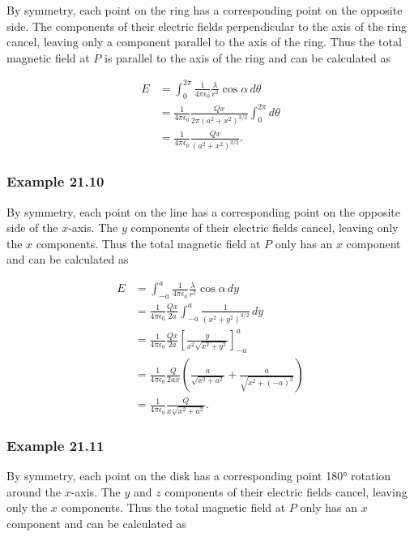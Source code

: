 \documentclass{article}
\begin{document}
By symmetry, each point on the ring has a corresponding point on the opposite side. The components of their electric fields perpendicular to the axis of the ring cancel, leaving only a component parallel to the axis of the ring. Thus the total magnetic field at $P$ is parallel to the axis of the ring and can be calculated as

\begin{align*}
  E & = \int_0^{2\pi} \frac{1}{4\pi\epsilon_0} \frac{\lambda}{r^2} \cos \alpha\,d\theta \\
    & = \frac{1}{4\pi\epsilon_0} \frac{Qx}{2\pi(a^2 + x^2)^{3/2}} \int_0^{2\pi} d\theta \\
    & = \frac{1}{4\pi\epsilon_0} \frac{Qx}{(a^2 + x^2)^{3/2}}.
\end{align*}

\subsubsection{Example 21.10}

By symmetry, each point on the line has a corresponding point on the opposite side of the $x$-axis. The $y$ components of their electric fields cancel, leaving only the $x$ components. Thus the total magnetic field at $P$ only has an $x$ component and can be calculated as

\begin{align*}
  E & = \int_{-a}^a \frac{1}{4\pi\epsilon_0} \frac{\lambda}{r^2} \cos\alpha\,dy                                        \\
    & = \frac{1}{4\pi\epsilon_0} \frac{Qx}{2a} \int_{-a}^a \frac{1}{(x^2 + y^2)^{3/2}}\,dy                             \\
    & = \frac{1}{4\pi\epsilon_0} \frac{Qx}{2a} \left[\frac{y}{x^2\sqrt{x^2+y^2}}\right]_{-a}^a                         \\
    & = \frac{1}{4\pi\epsilon_0} \frac{Q}{2ax} \left(\frac{a}{\sqrt{x^2 + a^2}} + \frac{a}{\sqrt{x^2 + (-a)^2}}\right) \\
    & = \frac{1}{4\pi\epsilon_0} \frac{Q}{x\sqrt{x^2 + a^2}}.
\end{align*}

\subsubsection{Example 21.11}

By symmetry, each point on the disk has a corresponding point 180° rotation around the $x$-axis. The $y$ and $z$ components of their electric fields cancel, leaving only the $x$ components. Thus the total magnetic field at $P$ only has an $x$ component and can be calculated as
\end{document}
